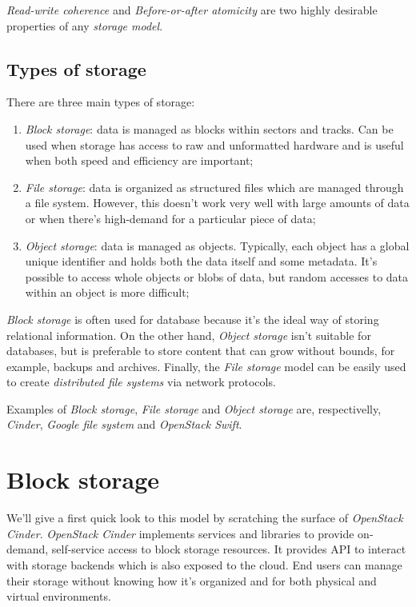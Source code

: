 \noindent
\emph{Read-write coherence} and \emph{Before-or-after atomicity} are two highly
desirable properties of any \emph{storage model}.

\subsection{Types of storage}
There are three main types of storage:
\begin{enumerate}
    \item \emph{Block storage}: data is managed as blocks within sectors and
    tracks. Can be used when storage has access to raw and unformatted hardware
    and is useful when both speed and efficiency are important;
    \item \emph{File storage}: data is organized as structured files which are
    managed through a file system. However, this doesn't work very well with
    large amounts of data or when there's high-demand for a particular piece
    of data;
    \item \emph{Object storage}: data is managed as objects. Typically, each
    object has a global unique identifier and holds both the data itself and
    some metadata. It's possible to access whole objects or blobs of data, but
    random accesses to data within an object is more difficult;
\end{enumerate}

\noindent
\emph{Block storage} is often used for database because it's the ideal way of
storing relational information. On the other hand, \emph{Object storage} isn't
suitable for databases, but is preferable to store content that can grow without
bounds, for example, backups and archives. Finally, the \emph{File storage} model
can be easily used to create \emph{distributed file systems} via network protocols.

Examples of \emph{Block storage}, \emph{File storage} and \emph{Object storage}
are, respectivelly, \emph{Cinder}, \emph{Google file system} and \emph{OpenStack
Swift}.

\section{Block storage}
We'll give a first quick look to this model by scratching the surface of
\emph{OpenStack Cinder}. \emph{OpenStack Cinder} implements services and libraries
to provide on-demand, self-service access to block storage resources. It provides
API to interact with storage backends which is also exposed to the cloud. End
users can manage their storage without knowing how it's organized and for both
physical and virtual environments.

